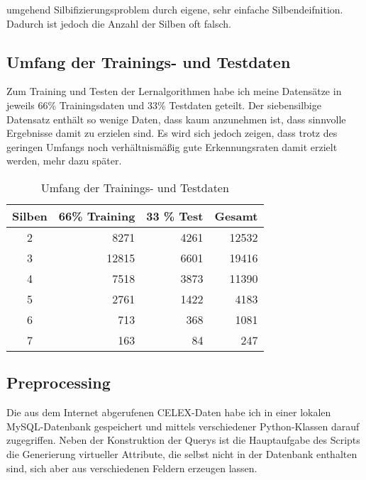 \cite{Dou&Bergsma2009} umgehend Silbifizierungsproblem durch eigene, sehr einfache Silbendeifnition. Dadurch ist jedoch die Anzahl der Silben oft falsch.


\subsection{Umfang der Trainings- und Testdaten}

Zum Training und Testen der Lernalgorithmen habe ich meine Datensätze in jeweils 66\% Trainingsdaten und 33\% Testdaten geteilt. Der siebensilbige Datensatz enthält so wenige Daten, dass kaum anzunehmen ist, dass sinnvolle Ergebnisse damit zu erzielen sind. Es wird sich jedoch zeigen, dass trotz des geringen Umfangs noch verhältnismäßig gute Erkennungsraten damit erzielt werden, mehr dazu später.

\begin{table}[h]
\centering
    \begin{tabular}{|c|rrr|}
    \hline
    Silben & 66\% Training   & 33 \% Test   & Gesamt \\ \hline
    2       & 8271            & 4261 & 12532  \\
    3       & 12815           & 6601 & 19416  \\
    4       & 7518            & 3873 & 11390  \\
    5        & 2761            & 1422 & 4183  \\
    6        & 713             & 368 & 1081   \\
    7      & 163             & 84 & 247       \\ \hline
    \end{tabular}
\caption{Umfang der Trainings- und Testdaten}
\end{table}

\subsection{Preprocessing}
Die aus dem Internet abgerufenen CELEX-Daten habe ich in einer lokalen MySQL-Datenbank gespeichert und mittels verschiedener Python-Klassen darauf zugegriffen. Neben der Konstruktion der Querys ist die Hauptaufgabe des Scripts die Generierung virtueller Attribute, die selbst nicht in der Datenbank enthalten sind, sich aber aus verschiedenen Feldern erzeugen lassen. 

